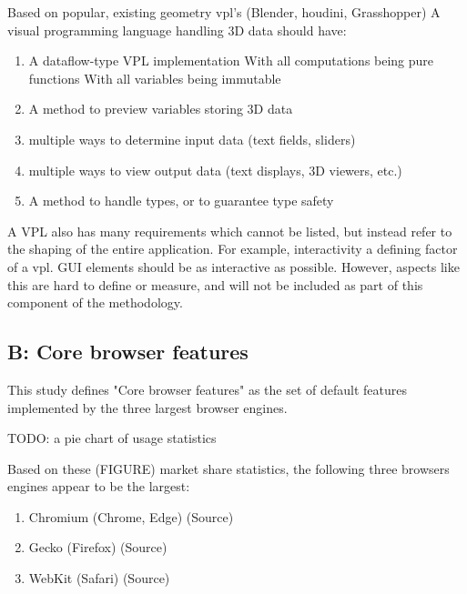 Based on popular, existing geometry vpl's (Blender, houdini, Grasshopper) A visual programming language handling 3D data should have:
\begin{enumerate}[-]
  \item A dataflow-type VPL implementation
  \subitem With all computations being pure functions
  \subitem With all variables being immutable
  \item A method to preview variables storing 3D data
  \item multiple ways to determine input data (text fields, sliders) 
  \item multiple ways to view output data (text displays, 3D viewers, etc.)
  \item A method to handle types, or to guarantee type safety
\end{enumerate}

A VPL also has many requirements which cannot be listed, but instead refer to the shaping of the entire application. 
For example, interactivity a defining factor of a vpl. GUI elements should be as interactive as possible.
However, aspects like this are hard to define or measure, and will not be included as part of this component of the methodology. 



\subsection*{B: Core browser features}
This study defines "Core browser features" as the set of default features implemented by the three largest browser engines. 
\begin{note}
TODO: a pie chart of usage statistics
\end{note}
Based on these (FIGURE) market share statistics, the following three browsers engines appear to be the largest:
\begin{enumerate}[-]
  \item Chromium (Chrome, Edge) (Source)
  \item Gecko (Firefox) (Source)
  \item WebKit (Safari) (Source)
\end{enumerate}

